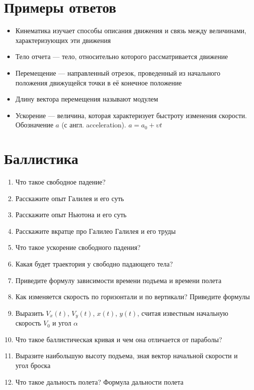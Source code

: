 \documentclass[12pt,a4paper]{report}
\begin{document}
\section{Примеры ответов}
\begin{itemize}
\item Кинематика изучает способы описания движения и связь между величинами, характеризующих эти движения
\item Тело отчета --- тело, относительно которого рассматривается движение
\item Перемещение --- направленный отрезок, проведенный из начального положения движущейся точки в её конечное положение
\item Длину вектора перемещения называют модулем
\item Ускорение --- величина, которая характеризует быстроту изменения скорости. Обозначение $a$ (с англ. acceleration). $a = a_0 + \upsilon t$
\end{itemize} 

\section{Баллистика}
\begin{enumerate}
\item Что такое свободное падение?
\item Расскажите опыт Галилея и его суть
\item Расскажите опыт Ньютона и его суть
\item Расскажите вкратце про Галилео Галилея и его труды
\item Что такое ускорение свободного падения?
\item Какая будет траектория у свободно падающего тела?
\item Приведите формулу зависимости времени подъема и времени полета
\item Как изменяется скорость по горизонтали и по вертикали? Приведите формулы
\item Выразить $V_x(t)$, $V_y(t)$, $x(t)$, $y(t)$, считая известным начальную скорость $V_0$ и угол $\alpha$
\item Что такое баллистическая кривая и чем она отличается от параболы?
\item Выразите наибольшую высоту подъема, зная вектор начальной скорости и угол броска
\item Что такое дальность полета? Формула дальности полета
\end{enumerate}
\end{document}

